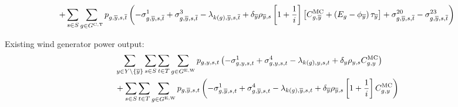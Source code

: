 \documentclass{article}
\begin{document}
\begin{equation}
+ \sum\limits_{\iScenario \in \sScenarios} \sum\limits_{\iGenerator \in \sGeneratorsCandidateThermal} \vPower[\iGenerator,\iYearTerminal,\iScenario,\iIntervalTerminal] \left(-\dMinPowerOutput[\iGenerator,\iYearTerminal,\iScenario,\iIntervalTerminal] + \dMaxPowerOutputCandidateThermal[\iGenerator,\iYearTerminal,\iScenario,\iIntervalTerminal] - \dPowerBalance[k(\iGenerator),\iYearTerminal,\iScenario,\iIntervalTerminal] + \cDiscountRate[\iYearTerminal] \cScenarioDuration[\iYearTerminal,\iScenario] \left[1 + \frac{1}{\cInterestRate}\right] \left[\cMarginalCost[\iGenerator,\iYearTerminal] + \left(\cEmissionsIntensity - \vBaseline[\iYearTerminal]\right)\vPermitPrice[\iYearTerminal] \right] + \dRampRateUp[\iGenerator,\iYearTerminal,\iScenario,\iIntervalTerminal] - \dRampRateDown[\iGenerator,\iYearTerminal,\iScenario,\iIntervalTerminal] \right)
\end{equation}

Existing wind generator power output:
\begin{align}
	& \sum\limits_{\iYear \in \sYears 
		\setminus \{\iYearTerminal\}
	}\sum\limits_{\iScenario \in \sScenarios}\sum\limits_{\iInterval \in \sIntervals} \sum\limits_{\iGenerator \in \sGeneratorsExistingWind} \vPower\left(-\dMinPowerOutput + \dMaxPowerOutputWindExisting
	- \dPowerBalance[k(\iGenerator),\iYear,\iScenario,\iInterval] + \cDiscountRate \cScenarioDuration\cMarginalCost
	\right)\nonumber\\
	& + \sum\limits_{\iScenario \in \sScenarios} \sum\limits_{\iInterval \in \sIntervals} \sum\limits_{\iGenerator \in \sGeneratorsExistingWind} \vPower[\iGenerator,\iYearTerminal,\iScenario,\iInterval] \left(-\dMinPowerOutput[\iGenerator,\iYearTerminal,\iScenario,\iInterval] + \dMaxPowerOutputWindExisting[\iGenerator,\iYearTerminal,\iScenario,\iInterval] - \dPowerBalance[k(\iGenerator),\iYearTerminal,\iScenario,\iInterval] + \cDiscountRate[\iYearTerminal] \cScenarioDuration[\iYearTerminal,\iScenario] \left[1 + \frac{1}{\cInterestRate}\right] \cMarginalCost \right)\\\nonumber
\end{align}
\end{document}
